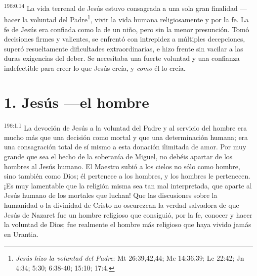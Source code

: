 \par
\textsuperscript{196:0.14} La vida terrenal de Jesús estuvo consagrada a una sola gran finalidad ---hacer la voluntad del Padre\footnote{\textit{Jesús hizo la voluntad del Padre}: Mt 26:39,42,44; Mc 14:36,39; Lc 22:42; Jn 4:34; 5:30; 6:38-40; 15:10; 17:4.}, vivir la vida humana religiosamente y por la fe. La fe de Jesús era confiada como la de un niño, pero sin la menor presunción. Tomó decisiones firmes y valientes, se enfrentó con intrepidez a múltiples decepciones, superó resueltamente dificultades extraordinarias, e hizo frente sin vacilar a las duras exigencias del deber. Se necesitaba una fuerte voluntad y una confianza indefectible para creer lo que Jesús creía, y \textit{como} él lo creía.

\section*{1. Jesús ---el hombre}
\par
\textsuperscript{196:1.1} La devoción de Jesús a la voluntad del Padre y al servicio del hombre era mucho más que una decisión como mortal y que una determinación humana; era una consagración total de sí mismo a esta donación ilimitada de amor. Por muy grande que sea el hecho de la soberanía de Miguel, no debéis apartar de los hombres al Jesús humano. El Maestro subió a los cielos no sólo como hombre, sino también como Dios; él pertenece a los hombres, y los hombres le pertenecen. ¡Es muy lamentable que la religión misma sea tan mal interpretada, que aparte al Jesús humano de los mortales que luchan! Que las discusiones sobre la humanidad o la divinidad de Cristo no oscurezcan la verdad salvadora de que Jesús de Nazaret fue un hombre religioso que consiguió, por la fe, conocer y hacer la voluntad de Dios; fue realmente el hombre más religioso que haya vivido jamás en Urantia.

